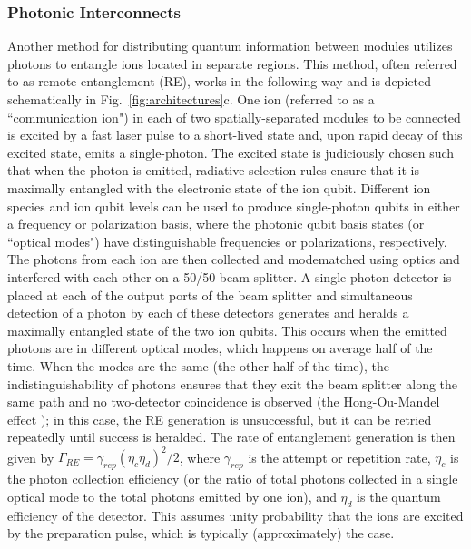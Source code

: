 \documentclass[%
reprint,
 amsmath,amssymb,
]{revtex4-1}
\begin{document}
    \subsubsection{Photonic Interconnects}
    \label{PhotonInter}
Another method for distributing quantum information between modules utilizes photons \cite{MonroeModularArch2014} to entangle ions located in separate regions.  This method, often referred to as remote entanglement (RE), works in the following way and is depicted schematically in Fig.~\ref{fig:architectures}c.  One ion (referred to as a ``communication ion") in each of two spatially-separated modules to be connected is excited by a fast laser pulse to a short-lived state and, upon rapid decay of this excited state, emits a single-photon.  The excited state is judiciously chosen such that when the photon is emitted, radiative selection rules ensure that it is maximally entangled with the electronic state of the ion qubit.  Different ion species and ion qubit levels can be used to produce single-photon qubits in either a frequency \cite{Moehring2007} or polarization \cite{BlinovIonPhotonEntangle2004} basis, where the photonic qubit basis states (or ``optical modes") have distinguishable frequencies or polarizations, respectively.  The photons from each ion are then collected and modematched using optics and interfered with each other on a 50/50 beam splitter.  A single-photon detector is placed at each of the output ports of the beam splitter and simultaneous detection of a photon by each of these detectors generates and heralds a maximally entangled state of the two ion qubits.  This occurs when the emitted photons are in different optical modes, which happens on average half of the time.  When the modes are the same (the other half of the time), the indistinguishability of photons ensures that they exit the beam splitter along the same path and no two-detector coincidence is observed (the Hong-Ou-Mandel effect \cite{HongOuMandel1987}); in this case, the RE generation is unsuccessful, but it can be retried repeatedly until success is heralded.  The rate of entanglement generation is then given by $\Gamma_{RE}=\gamma_{rep}(\eta_{c}\eta_{d})^2/2$, where $\gamma_{rep}$ is the attempt or repetition rate, $\eta_{c}$ is the photon collection efficiency (or the ratio of total photons collected in a single optical mode to the total photons emitted by one ion), and $\eta_{d}$ is the quantum efficiency of the detector.  This assumes unity probability that the ions are excited by the preparation pulse, which is typically (approximately) the case.
\end{document}

